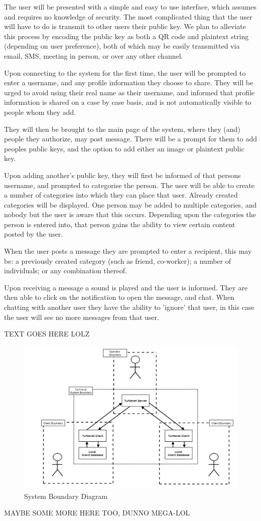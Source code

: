 The user will be presented with a simple and easy to use interface, which
assumes and requires no knowledge of security. The most complicated thing that
the user will have to do is transmit to other users their public key. We plan
to alleviate this process by encoding the public key as both a QR code and
plaintext string (depending on user preference), both of which may be easily
transmitted via email, SMS, meeting in person, or over any other channel.

Upon connecting to the system for the first time, the user will be prompted to
enter a username, and any profile information they choose to share. They will be
urged to avoid using their real name as their username, and informed that
profile information is shared on a case by case basis, and is not automatically
visible to people whom they add.

They will then be brought to the main page of the system, where they (and)
people they authorize, may post message. There will be a prompt for them to add
peoples public keys, and the option to add either an image or plaintext public
key.

Upon adding another's public key, they will first be informed of that persons
username, and prompted to categorise the person. The user will be able to create
a number of categories into which they can place that user. Already created
categories will be displayed. One person may be added to multiple categories,
and nobody but the user is aware that this occurs. Depending upon the categories
the person is entered into, that person gains the ability to view certain
content posted by the user.

When the user posts a message they are prompted to enter a recipient, this may
be: a previously created category (such as friend, co-worker); a number
of individuals; or any combination thereof.

Upon receiving a message a sound is played and the user is informed. They are
then able to click on the notification to open the message, and chat. When
chatting with another user they have the ability to 'ignore' that user, in this
case the user will see no more messages from that user.

TEXT GOES HERE LOLZ

\begin{figure}[h]
    \centering
    \includegraphics[width=\textwidth]{images/requirements/systemboundarydiagram.jpg}
    \caption{System Boundary Diagram}
    \label{fig:sbd_diag}
\end{figure}

MAYBE SOME MORE HERE TOO, DUNNO MEGA-LOL
